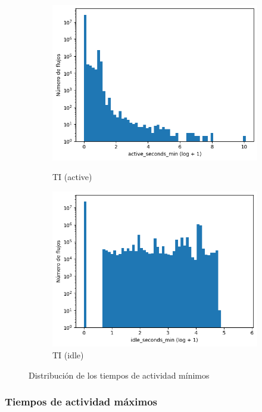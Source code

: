 \begin{figure}[H]
\begin{subfigure}[b]{0.26\textwidth}
        \includegraphics[width=\linewidth]{media/packet_pincer_toniot/active_seconds_min_log_x_log_y.png}
        \caption{TI (active)}
        \includegraphics[width=\linewidth]{media/packet_pincer_toniot/idle_seconds_min_log_x_log_y.png}
        \caption{TI (idle)}
    \end{subfigure}
       \caption{Distribución de los tiempos de actividad mínimos}
       \label{fig:packet_pincer_active_seconds_min}
\end{figure}

\subsubsection{Tiempos de actividad máximos}


